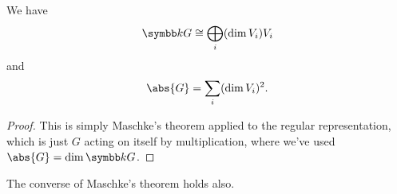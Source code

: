 \begin{crl}{}{}
    We have
    \begin{equation}
        \field G \isomorphic \bigoplus_i (\dim V_i) V_i
    \end{equation}
    and
    \begin{equation}
        \abs{G} = \sum_i (\dim V_i)^2.
    \end{equation}
    \begin{proof}
        This is simply Maschke's theorem applied to the regular representation, which is just \(G\) acting on itself by multiplication, where we've used \(\abs{G} = \dim \field G\).
    \end{proof}
\end{crl}

The converse of Maschke's theorem holds also.

